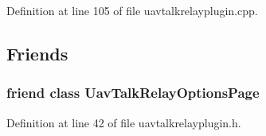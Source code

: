 \-Definition at line 105 of file uavtalkrelayplugin.\-cpp.



\subsection{\-Friends}
\hypertarget{group___u_a_v_talk_gaf20a0868107dbd85408f5bcba4e98063}{
\subsubsection[{\-Uav\-Talk\-Relay\-Options\-Page}]{\setlength{\rightskip}{0pt plus 5cm}friend class {\bf \-Uav\-Talk\-Relay\-Options\-Page}}}\label{group___u_a_v_talk_gaf20a0868107dbd85408f5bcba4e98063}


\-Definition at line 42 of file uavtalkrelayplugin.\-h.

